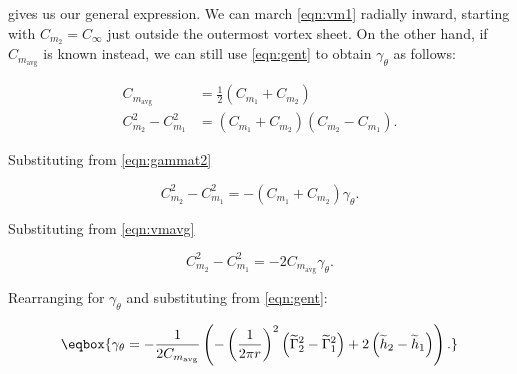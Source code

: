 \noindent gives us our general expression.
We can march \cref{eqn:vm1} radially inward, starting with \(C_{m_2} = C_\infty\) just outside the outermost vortex sheet.
%
On the other hand, if \(C_{m_\text{avg}}\) is known instead, we can still use \cref{eqn:gent} to obtain \(\gamma_\theta\) as follows:

\begin{align}
    \label{eqn:vmavg}
    C_{m_\text{avg}} &= \frac{1}{2}\left(C_{m_1} + C_{m_2}\right) \\
    C_{m_2}^2 - C_{m_1}^2 &= \left(C_{m_1} + C_{m_2}\right)\left(C_{m_2} - C_{m_1}\right).
\end{align}

\noindent Substituting from \cref{eqn:gammat2}

\begin{equation}
    C_{m_2}^2 - C_{m_1}^2 = -\left(C_{m_1} + C_{m_2}\right) \gamma_\theta.
\end{equation}

\noindent Substituting from \cref{eqn:vmavg}

\begin{equation}
    C_{m_2}^2 - C_{m_1}^2 = -2C_{m_\text{avg}} \gamma_\theta.
\end{equation}

\noindent Rearranging for \(\gamma_\theta\) and substituting from \cref{eqn:gent}:

\begin{equation}
    \label{eqn:gamma_theta_general}
    \eqbox{
        \gamma_\theta = -\frac{1}{2 C_{m_\text{avg}}} \left(- \left(\frac{1}{2 \pi r}\right)^2 \left(\widetilde{\Gamma}_2^2-\widetilde{\Gamma}_1^2\right) + 2 \left( \widetilde{h}_2 - \widetilde{h}_1 \right) \right).
    }
\end{equation}


